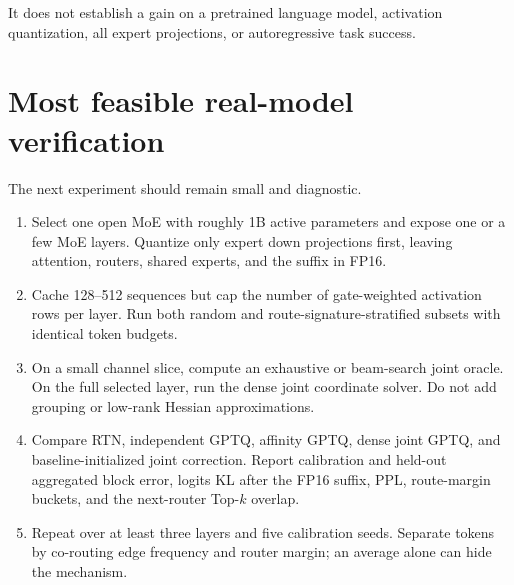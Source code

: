 \documentclass[11pt]{article}
\theoremstyle{plain}
\theoremstyle{definition}
\theoremstyle{remark}
\begin{document}
It does not establish a gain on a pretrained language model, activation quantization, all expert projections, or autoregressive task success.

\section{Most feasible real-model verification}

The next experiment should remain small and diagnostic.

\begin{enumerate}
  \item Select one open MoE with roughly 1B active parameters and expose one or a few MoE layers.  Quantize only expert down projections first, leaving attention, routers, shared experts, and the suffix in FP16.
  \item Cache 128--512 sequences but cap the number of gate-weighted activation rows per layer.  Run both random and route-signature-stratified subsets with identical token budgets.
  \item On a small channel slice, compute an exhaustive or beam-search joint oracle.  On the full selected layer, run the dense joint coordinate solver.  Do not add grouping or low-rank Hessian approximations.
  \item Compare RTN, independent GPTQ, affinity GPTQ, dense joint GPTQ, and baseline-initialized joint correction.  Report calibration and held-out aggregated block error, logits KL after the FP16 suffix, PPL, route-margin buckets, and the next-router Top-$k$ overlap.
  \item Repeat over at least three layers and five calibration seeds.  Separate tokens by co-routing edge frequency and router margin; an average alone can hide the mechanism.
\end{enumerate}

\begin{center}
\end{center}
\end{document}
